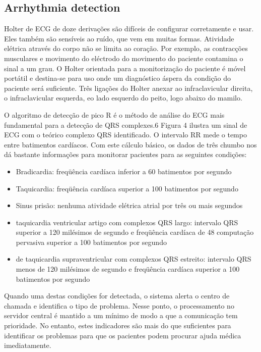 \documentclass[a4paper,12pt]{article}
\begin{document}
\subsection{Arrhythmia detection}


Holter de ECG de doze derivações são difíceis de configurar corretamente e usar. Eles também são sensíveis ao ruído, que vem em muitas formas. Atividade elétrica através do corpo não se limita ao coração. Por exemplo, as contracções musculares e movimento do eléctrodo do movimento do paciente contamina o sinal a um grau. O Holter orientada para a monitorização do paciente é móvel portátil e destina-se para uso onde um diagnóstico áspera da condição do paciente será suficiente. Três ligações do Holter anexar ao infraclavicular direita, o infraclavicular esquerda, eo lado esquerdo do peito, logo abaixo do mamilo.

O algoritmo de detecção de pico R é o método de análise do ECG mais fundamental para a detecção de QRS complexes.6 Figura 4 ilustra um sinal de ECG com o teórico complexo QRS identificado. O intervalo RR mede o tempo entre batimentos cardíacos. Com este cálculo básico, os dados de três chumbo nos dá bastante informações para monitorar pacientes para as seguintes condições:
\begin{itemize}
\item Bradicardia: freqüência cardíaca inferior a 60 batimentos por segundo
\item Taquicardia: freqüência cardíaca superior a 100 batimentos por segundo
\item Sinus prisão: nenhuma atividade elétrica atrial por três ou mais segundos
\item taquicardia ventricular artigo com complexos QRS largo: intervalo QRS superior a 120 milésimos de segundo e freqüência cardíaca de 48 computação pervasiva superior a 100 batimentos por segundo
\item de taquicardia supraventricular com complexos QRS estreito: intervalo QRS menos de 120 milésimos de segundo e freqüência cardíaca superior a 100 batimentos por segundo
\end{itemize}

Quando uma destas condições for detectada, o sistema alerta o centro de chamada e identifica o tipo de problema. Nesse ponto, o processamento no servidor central é mantido a um mínimo de modo a que a comunicação tem prioridade. No entanto, estes indicadores são mais do que suficientes para identificar os problemas para que os pacientes podem procurar ajuda médica imediatamente.
\end{document}

